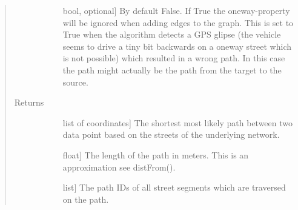 \documentclass[letterpaper,10pt,english]{sphinxmanual}
\begin{document}
\begin{fulllineitems}
\begin{quote}
\begin{description}
\begin{description}
\item[{}] \leavevmode{[}bool, optional{]}
By default False. If True the oneway-property will be ignored when adding edges to the graph. This is set to True when the algorithm detects a GPS glipse (the vehicle seems to drive a tiny bit backwards on a oneway street which is not possible) which resulted in a wrong path. In this case the path might actually be the path from the target to the source.

\end{description}

\item[{Returns}] \leavevmode\begin{description}
\item[{}] \leavevmode{[}list of coordinates{]}
The shortest \textendash{} most likely \textendash{} path between two data point based on the streets of the underlying network.

\item[{}] \leavevmode{[}float{]}
The length of the path in meters. This is an approximation \textendash{} see distFrom().

\item[{}] \leavevmode{[}list{]}
The path IDs of all street segments which are traversed on the path.

\end{description}

\end{description}\end{quote}

\end{fulllineitems}

\end{document}
